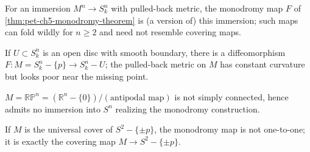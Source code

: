 \begin{example}
  \label{ex:pet-ch5-immersion-monodromy}
  For an immersion $M^n\to S^n_k$ with pulled-back metric, the monodromy map $F$ of
  \cref{thm:pet-ch5-monodromy-theorem} is (a version of) this immersion; such maps
  can fold wildly for $n\ge2$ and need not resemble covering maps.
\end{example}

\begin{example}
  \label{ex:pet-ch5-folding-immersion}
  If $U\subset S^n_k$ is an open disc with smooth boundary, there is a
  diffeomorphism $F:M=S^n_k-\{p\}\to S^n_k-U$; the pulled-back metric on $M$ has
  constant curvature but looks poor near the missing point.
\end{example}

\begin{example}
  \label{ex:pet-ch5-rp-n-no-immersion}
  $M=\mathbb{RP}^n=(\mathbb R^n-\{0\})/(\text{antipodal map})$ is not simply
  connected, hence admits no immersion into $S^n$ realizing the monodromy
  construction.
\end{example}

\begin{example}
  \label{ex:pet-ch5-universal-cover-monodromy}
  If $M$ is the universal cover of $S^2-\{\pm p\}$, the monodromy map is not
  one-to-one; it is exactly the covering map $M\to S^2-\{\pm p\}$.
\end{example}

